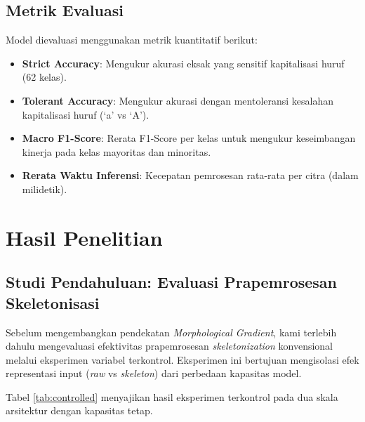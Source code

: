 \documentclass[journal]{IEEEtran}
\begin{document}
\subsection{Metrik Evaluasi}
Model dievaluasi menggunakan metrik kuantitatif berikut:
\begin{itemize}
    \item \textbf{Strict Accuracy}: Mengukur akurasi eksak yang sensitif kapitalisasi huruf (62 kelas).
    \item \textbf{Tolerant Accuracy}: Mengukur akurasi dengan mentoleransi kesalahan kapitalisasi huruf (`a' vs `A').
    \item \textbf{Macro F1-Score}: Rerata F1-Score per kelas untuk mengukur keseimbangan kinerja pada kelas mayoritas dan minoritas.
    \item \textbf{Rerata Waktu Inferensi}: Kecepatan pemrosesan rata-rata per citra (dalam milidetik).
\end{itemize}

\section{Hasil Penelitian}
\label{sec:hasil}

\subsection{Studi Pendahuluan: Evaluasi Prapemrosesan Skeletonisasi}
\label{sec:pendahuluan_skel}
Sebelum mengembangkan pendekatan \textit{Morphological Gradient}, kami terlebih dahulu mengevaluasi efektivitas prapemrosesan \textit{skeletonization} konvensional melalui eksperimen variabel terkontrol. Eksperimen ini bertujuan mengisolasi efek representasi input (\textit{raw} vs \textit{skeleton}) dari perbedaan kapasitas model.

Tabel \ref{tab:controlled} menyajikan hasil eksperimen terkontrol pada dua skala arsitektur dengan kapasitas tetap.

\begin{table}[htbp]
\caption{Studi Pendahuluan: Eksperimen Variabel Terkontrol Prapemrosesan Skeletonisasi}
\label{tab:controlled}
\begin{center}
\footnotesize
\setlength{\tabcolsep}{4pt}
\end{center}
\end{table}
\end{document}
